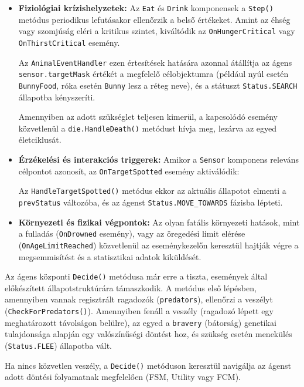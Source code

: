 \begin{itemize}
    \item \textbf{Fiziológiai krízishelyzetek:} Az \texttt{Eat} és \texttt{Drink} komponensek a \texttt{Step()} metódus periodikus lefutásakor ellenőrzik a belső értékeket. Amint az éhség vagy szomjúság eléri a kritikus szintet, kiváltódik az \texttt{OnHungerCritical} vagy \texttt{OnThirstCritical} esemény.

Az \texttt{AnimalEventHandler} ezen értesítések hatására azonnal átállítja az ágens \texttt{sensor.targetMask} értékét a megfelelő célobjektumra (például nyúl esetén \texttt{BunnyFood}, róka esetén \texttt{Bunny} lesz a réteg neve), és a státuszt \texttt{Status.SEARCH} állapotba kényszeríti.

Amennyiben az adott szükséglet teljesen kimerül, a kapcsolódó esemény közvetlenül a \texttt{die.HandleDeath()} metódust hívja meg, lezárva az egyed életciklusát.

    \item \textbf{Érzékelési és interakciós triggerek:} Amikor a \texttt{Sensor} komponens releváns célpontot azonosít, az \texttt{OnTargetSpotted} esemény aktiválódik: 

Az \texttt{HandleTargetSpotted()} metódus ekkor az aktuális állapotot elmenti a \texttt{prevStatus} változóba, és az ágenst \texttt{Status.MOVE\_TOWARDS} fázisba lépteti.

    \item \textbf{Környezeti és fizikai végpontok:} Az olyan fatális környezeti hatások, mint a fulladás (\texttt{OnDrowned} esemény), vagy az öregedési limit elérése (\texttt{OnAgeLimitReached}) közvetlenül az eseménykezelőn keresztül hajtják végre a megsemmisítést és a statisztikai adatok kiküldését.
\end{itemize}

Az ágens központi \texttt{Decide()} metódusa már erre a tiszta, események által előkészített állapotstruktúrára támaszkodik. A metódus első lépésben, amennyiben vannak regisztrált ragadozók (\texttt{predators}), ellenőrzi a veszélyt (\texttt{CheckForPredators()}). Amennyiben fenáll a veszély (ragadozó lépett egy meghatározott távolságon belülre), az egyed a \texttt{bravery} (bátorság) genetikai tulajdonsága alapján egy valószínűségi döntést hoz, és szükség esetén menekülés (\texttt{Status.FLEE}) állapotba vált. 

Ha nincs közvetlen veszély, a \texttt{Decide()} metóduson keresztül navigálja az ágenst adott döntési folyamatnak megfelelően (FSM, Utility vagy FCM).

